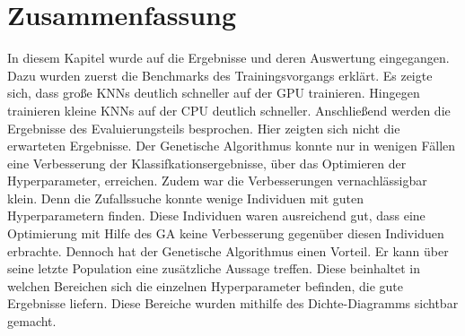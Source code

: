 \newpage

\section{Zusammenfassung}
In diesem Kapitel wurde auf die Ergebnisse und deren Auswertung eingegangen. Dazu wurden zuerst die Benchmarks des Trainingsvorgangs erklärt. Es zeigte sich, dass große KNNs deutlich schneller auf der GPU trainieren. Hingegen trainieren kleine KNNs auf der CPU deutlich schneller. Anschließend werden die Ergebnisse des Evaluierungsteils besprochen. Hier zeigten sich nicht die erwarteten Ergebnisse. Der Genetische Algorithmus konnte nur in wenigen Fällen eine Verbesserung der Klassifkationsergebnisse, über das Optimieren der Hyperparameter, erreichen. Zudem war die Verbesserungen vernachlässigbar klein. Denn die Zufallssuche konnte wenige Individuen mit guten Hyperparametern finden. Diese Individuen waren ausreichend gut, dass eine Optimierung mit Hilfe des GA keine Verbesserung gegenüber diesen Individuen erbrachte. Dennoch hat der Genetische Algorithmus einen Vorteil. Er kann über seine letzte Population eine zusätzliche Aussage treffen. Diese beinhaltet in welchen Bereichen sich die einzelnen Hyperparameter befinden, die gute Ergebnisse liefern. Diese Bereiche wurden mithilfe des Dichte-Diagramms sichtbar gemacht.